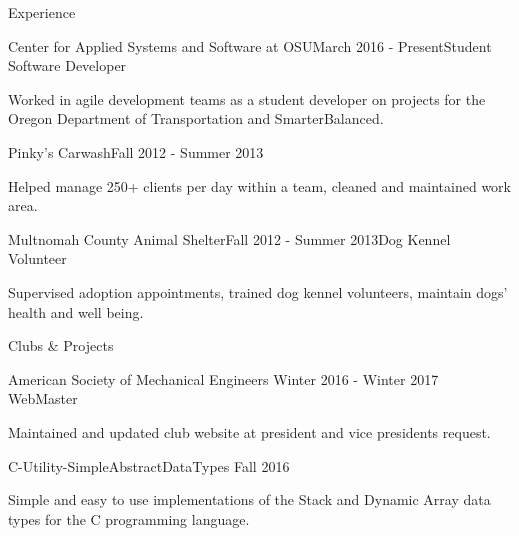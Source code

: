 \documentclass{resume} %
\begin{document}

\begin{rSection}{Experience}

  \begin{rSubsection}{Center for Applied Systems and Software at OSU}{March 2016 - Present}{Student Software Developer}{}
  \item Worked in agile development teams as a student developer on projects for the Oregon  Department of Transportation and SmarterBalanced.
  \end{rSubsection}

  \begin{rSubsection}{Pinky’s Carwash}{Fall 2012 - Summer 2013}{}{}
  \item Helped manage 250+ clients per day within a team, cleaned and maintained work area.
  \end{rSubsection}
  
  \begin{rSubsection}{Multnomah County Animal Shelter}{Fall 2012 - Summer 2013}{Dog Kennel Volunteer}{}
  \item Supervised adoption appointments, trained dog kennel volunteers, maintain dogs’ health and well being. 
  \end{rSubsection}

\end{rSection}


\begin{rSection}{Clubs \& Projects}
	\begin{rSubsection} {American Society of Mechanical Engineers} {Winter 2016 - Winter 2017} {WebMaster} {}
	\item Maintained and updated club website at president and vice presidents request.
	\end{rSubsection}
    
    \begin{rSubsection} {C-Utility-SimpleAbstractDataTypes} {Fall 2016} {} {}
    \item Simple and easy to use implementations of the Stack and Dynamic Array data types for the C programming language.
    \end{rSubsection}


\end{rSection}
\end{document}
